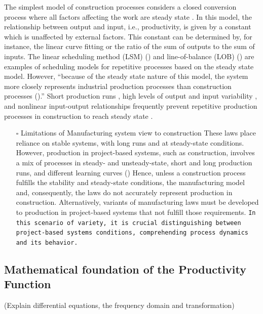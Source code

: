\documentclass{article}
\begin{document}
The simplest model of construction processes considers a closed conversion process where all factors affecting the work are steady state \citep{Drewin1982}.
In this model, the relationship between output and input, i.e., productivity, is given by a constant which is unaffected by external factors.
This constant can be determined by, for instance, the linear curve fitting or the ratio of the sum of outputs to the sum of inputs.
The linear scheduling method (LSM) (\citep{Harmelink1998,Su2016}) and line-of-balance (LOB) (\citep{Lumsden1968,Su2016,ZolfagharDolabi2014}) are examples of scheduling models for repetitive processes based on the steady state model.
However, ``because of the steady state nature of this model, the system more closely represents industrial production processes than construction processes (\citep{Thomas1990}).''
Short production runs \citep{Bashford2005}, high levels of output and input variability \cite{Gonzalez2009}, and nonlinear input-output relationships \citep{Bertelsen2003,Lutz1993} frequently prevent repetitive production processes in construction to reach steady state \citep{Antunes2015a,Walsh2007}.


\begin{itemize}
\item[{$\square$}] Limitations of Manufacturing system view to construction
These laws place reliance on stable systems, with long runs and at steady-state conditions.
However, production in project-based systems, such as construction, involves a mix of processes in steady- and unsteady-state, short and long production runs, and different learning curves (\citep{Antunes2015})
Hence, unless a construction process fulfills the stability and steady-state conditions, the manufacturing model and, consequently, the laws do not accurately represent production in construction.
Alternatively, variants of manufacturing laws must be developed to production in project-based systems that not fulfill those requirements.
\texttt{In this scenario of variety, it is crucial distinguishing between project-based systems conditions, comprehending process dynamics and its behavior.}
\end{itemize}


\subsection{Mathematical foundation of the Productivity Function}
\label{sec:org3a397ac}

(Explain differential equations, the frequency domain and transformation)
\end{document}
